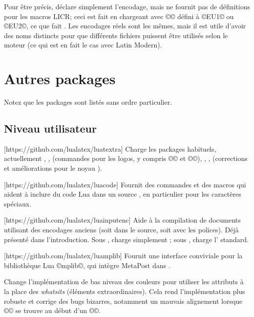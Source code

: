 \documentclass{lltxdoc}
\begin{document}
Pour être précis,  déclare simplement l'encodage, mais ne fournit pas
de définitions pour les macros LICR; ceci est fait en chargeant 
avec ©\UTFencname© défini à ©EU1© ou ©EU2©, ce que fait .
Les encodages réels sont les mêmes, mais il est utile d'avoir des noms distincts
pour que différents fichiers  puissent être utilisés selon le moteur
(ce qui est en fait le cas avec Latin Modern).

\section{Autres packages}\label{other}

Notez que les packages sont listés sans ordre particulier.

\subsection{Niveau utilisateur}

[https://github.com/lualatex/luatextra]
Charge les packages habituels, actuellement , , 
(commandes pour les logos, y compris ©\LuaTeX© et ©\LuaLaTeX©), ,
,  (corrections et améliorations pour le noyau \latex).

\pagebreak[4]
[https://github.com/lualatex/luacode]
Fournit des commandes et des macros qui aident à inclure du code Lua
dans un source \tex, en particulier pour les caractères spéciaux.

[https://github.com/lualatex/luainputenc]
Aide à la compilation de documents utilisant des encodages anciens
(soit dans le source, soit avec les polices). Déjà présenté dans l'introduction.
Sous \xetex, charge simplement ; sous \pdftex,
charge l' standard.

[https://github.com/lualatex/luamplib]
Fournit une interface conviviale pour la bibliothèque Lua ©mplib©,
qui intègre MetaPost dans \luatex.

Change l'implémentation de bas niveau des couleurs pour utiliser les attributs
\luatex à la place des \emph{whatsits} (\og{}éléments extraordinaires\fg{}).
Cela rend l'implémentation plus robuste et corrige des bugs bizarres, notamment
un mauvais alignement lorsque ©\color© se trouve au début d'un ©\vbox©.
\end{document}
